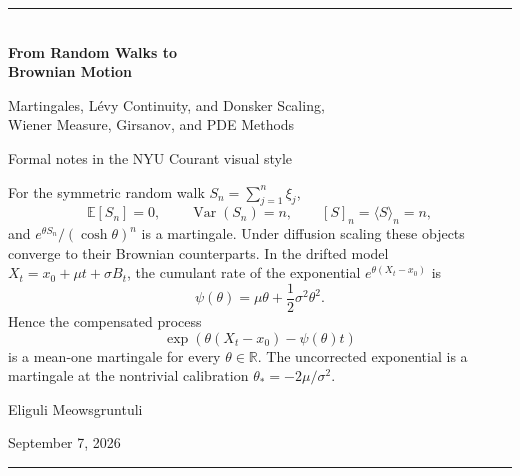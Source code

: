 \documentclass[10pt,a4paper]{article}
\numberwithin{equation}{section}
\theoremstyle{blueplain}
\theoremstyle{definition}
\newcommand{\E}{\mathbb E}
\newcommand{\R}{\mathbb R}
\newcommand{\Var}{\operatorname{Var}}
\begin{document}
\hypersetup{pageanchor=false}

\begin{titlepage}
  \pagecolor{Paper}
  \color{Ink}
  \vspace*{18mm}
  {\color{Blue}\rule{\textwidth}{1.4pt}}\\[12mm]
  {\Huge\bfseries From Random Walks to\\[1mm] Brownian Motion}\par
  \vspace{4mm}
  {\LARGE Martingales, L\'evy Continuity, and Donsker Scaling,\\[1.5mm]
  Wiener Measure, Girsanov, and PDE Methods}\par
  \vspace{8mm}
  {\large Formal notes in the NYU Courant visual style}\par
  \vfill

  \begin{keybox}
  For the symmetric random walk \(S_n=\sum_{j=1}^n\xi_j\),
  \[
    \E[S_n]=0,\qquad \Var(S_n)=n,\qquad
    [S]_n=\langle S\rangle_n=n,
  \]
  and \(e^{\theta S_n}/(\cosh\theta)^n\) is a martingale.  Under diffusion
  scaling these objects converge to their Brownian counterparts.  In the
  drifted model \(X_t=x_0+\mu t+\sigma B_t\), the cumulant rate of the
  exponential \(e^{\theta(X_t-x_0)}\) is
  \[
    \psi(\theta)=\mu\theta+\frac12\sigma^2\theta^2.
  \]
  Hence the compensated process
  \[
    \exp\!\left(\theta(X_t-x_0)-\psi(\theta)t\right)
  \]
  is a mean-one martingale for every \(\theta\in\R\).  The uncorrected
  exponential is a martingale at the nontrivial calibration
  \(\theta_*=-2\mu/\sigma^2\).
  \end{keybox}

  \vfill
  {\large Eliguli Meowsgruntuli}\par
  {\normalsize September 7, 2026}\par
  \vspace{8mm}
  {\color{Blue}\rule{\textwidth}{1.4pt}}
  \nopagecolor
\end{titlepage}
\hypersetup{pageanchor=true}
\end{document}
